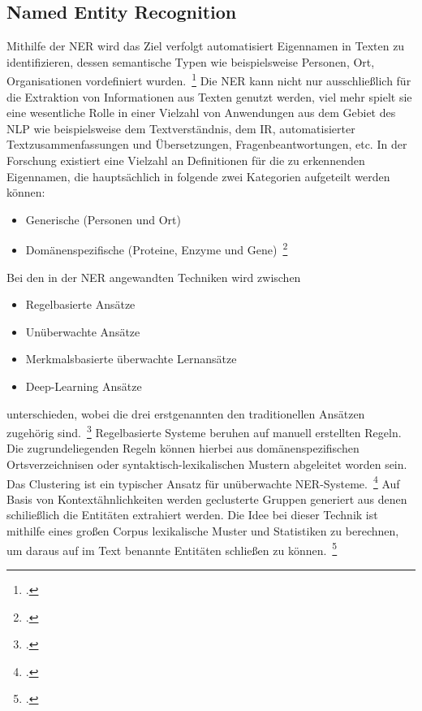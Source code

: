 \subsection{Named Entity Recognition}\label{sec:NER}

Mithilfe der \ac{NER} wird das Ziel verfolgt automatisiert Eigennamen in Texten zu identifizieren,
dessen semantische Typen wie beispielsweise Personen, Ort, Organisationen vordefiniert wurden.~\footcite[\vglf]
[]{nadeau.2007}
Die \ac{NER} kann nicht nur ausschließlich für die Extraktion von Informationen aus Texten genutzt werden, viel mehr
spielt sie eine wesentliche Rolle in einer Vielzahl von Anwendungen aus dem Gebiet des \ac{NLP} wie beispielsweise dem
Textverständnis, dem \ac{IR}, automatisierter Textzusammenfassungen und Übersetzungen, Fragenbeantwortungen, etc.
In der Forschung existiert eine Vielzahl an Definitionen für die zu erkennenden Eigennamen, die hauptsächlich in
folgende zwei Kategorien aufgeteilt werden können:
\begin{itemize}
    \item Generische (\zb Personen und Ort)
    \item Domänenspezifische (\zb Proteine, Enzyme und Gene)~\footcite[\vglf][]{li.2018}
\end{itemize}
Bei den in der \ac{NER} angewandten Techniken wird zwischen
\begin{itemize}
    \item Regelbasierte Ansätze
    \item Unüberwachte Ansätze
    \item Merkmalsbasierte überwachte Lernansätze
    \item Deep-Learning Ansätze
\end{itemize}
unterschieden, wobei die drei erstgenannten den traditionellen Ansätzen zugehörig sind.~\footcite[\vglf][]
{li.2018}
Regelbasierte Systeme beruhen auf manuell erstellten Regeln.
Die zugrundeliegenden Regeln können hierbei \zb aus domänenspezifischen Ortsverzeichnisen oder syntaktisch-lexikalischen
Mustern abgeleitet worden sein.\newline
Das Clustering ist ein typischer Ansatz für unüberwachte \ac{NER}-Systeme.~\footcite[\vglf][ f.]{nadeau.2007}
Auf Basis von Kontextähnlichkeiten werden geclusterte Gruppen generiert aus denen schiließlich die
Entitäten extrahiert werden.
Die Idee bei dieser Technik ist mithilfe eines großen Corpus lexikalische Muster und Statistiken zu berechnen, um daraus
auf im Text benannte Entitäten schließen zu können.~\footcite[\vglf][]{li.2018}\newline

